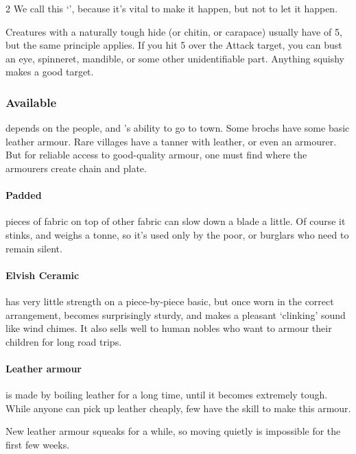 \begin{multicols}{2}
We call this `', because it's vital to make it happen, but not to let it happen.

Creatures with a naturally tough hide (or chitin, or carapace) usually have  of 5, but the same principle applies.
If you hit 5 over the Attack target, you can bust an eye, spinneret, mandible, or some other unidentifiable part.
Anything squishy makes a good target.

\armourchart

\subsubsection{Available }
depends on the people, and 's ability to go to town.
Some \glspl{broch} have some basic leather armour.
Rare \glspl{village} have a tanner with leather, or even an armourer.
But for reliable access to good-quality armour, one must find  where the \glspl{armourer} create chain and plate.

\paragraph{Padded}
pieces of fabric on top of other fabric can slow down a blade a little.
Of course it stinks, and weighs a tonne, so it's used only by the poor, or burglars who need to remain silent.

\paragraph{Elvish Ceramic}
has very little strength on a piece-by-piece basic, but once worn in the correct arrangement, becomes surprisingly sturdy, and makes a pleasant `clinking' sound like wind chimes.
It also sells well to human nobles who want to armour their children for long road trips. 

\paragraph{Leather armour}
is made by boiling leather for a long time, until it becomes extremely tough.
While anyone can pick up leather cheaply, few have the skill to make this armour.

New leather armour squeaks for a while, so moving quietly is impossible for the first few weeks.


\end{multicols}
